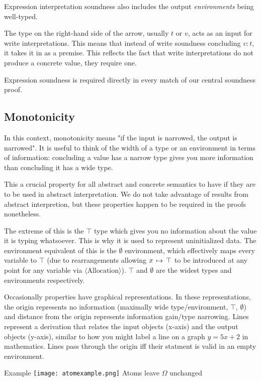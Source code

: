 \documentclass[12pt,twoside]{report}
\begin{document}
Expression interpretation soundness also includes the output \textit{environments} being well-typed.

The type on the right-hand side of the arrow, usually $t$ or $v$, acts as an input for write interpretations. This means that instead of write soundness concluding $v:t$, it takes it in as a premise. This reflects the fact that write interpretations do not produce a concrete value, they require one.

Expression soundness is required directly in every match of our central soundness proof.

\subsection{Monotonicity}
In this context, monotonicity means "if the input is narrowed, the output is narrowed". It is useful to think of the width of a type or an environment in terms of information: concluding a value has a narrow type gives you more information than concluding it has a wide type.

This a crucial property for all abstract and concrete semantics to have if they are to be used in abstract interpretation. We do not take advantage of results from abstract interpretion, but these properties happen to be required in the proofs nonetheless.

The extreme of this is the $\top$ type which gives you no information about the value it is typing whatsoever. This is why it is used to represent uninitialized data. The environment equivalent of this is the $\emptyset$ environment, which effectively maps every variable to $\top$ (due to rearrangements allowing $x \, \mapsto \, \top$ to be introduced at any point for any variable via $\langle\text{Allocation}\rangle$). $\top$ and $\emptyset$ are the widest types and environments respectively.

\noindent
\begin{minipage}{0.6\textwidth}
  \hspace{2.25ex} Occasionally properties have graphical representations. In these representations, the origin represents no information (maximally wide type/environment, $\top$, $\emptyset$) and distance from the origin represents information gain/type narrowing. Lines represent a derivation that relates the input objects (x-axis) and the output objects (y-axis), similar to how you might label a line on a graph $y = 5x + 2$ in mathematics. Lines pass through the origin iff their statment is valid in an empty environment.
\end{minipage}
\begin{minipage}{0.4\textwidth}
  \centering
  Example
  \texttt{[image: atomexample.png]}
  Atoms leave $\Omega$ unchanged
\end{minipage}
\end{document}
